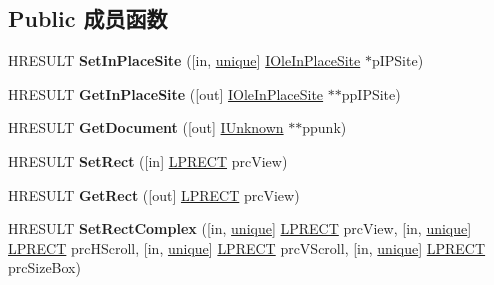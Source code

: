 \subsection*{Public 成员函数}
\begin{DoxyCompactItemize}
\item 
\mbox{\label{interface_i_ole_document_view_aad5d30750419f7ad5e5dbcf5954bf5b9}} 
H\+R\+E\+S\+U\+LT {\bfseries Set\+In\+Place\+Site} (\mbox{[}in, \hyperlink{interfaceunique}{unique}\mbox{]} \hyperlink{interface_i_ole_in_place_site}{I\+Ole\+In\+Place\+Site} $\ast$p\+I\+P\+Site)
\item 
\mbox{\label{interface_i_ole_document_view_a3d394c18927a0facfa48ddbb2cc671ba}} 
H\+R\+E\+S\+U\+LT {\bfseries Get\+In\+Place\+Site} (\mbox{[}out\mbox{]} \hyperlink{interface_i_ole_in_place_site}{I\+Ole\+In\+Place\+Site} $\ast$$\ast$pp\+I\+P\+Site)
\item 
\mbox{\label{interface_i_ole_document_view_aa91053c945356ad752ed4184f8032a21}} 
H\+R\+E\+S\+U\+LT {\bfseries Get\+Document} (\mbox{[}out\mbox{]} \hyperlink{interface_i_unknown}{I\+Unknown} $\ast$$\ast$ppunk)
\item 
\mbox{\label{interface_i_ole_document_view_a7c344fd81af281cbaacaeeb0dd918f5a}} 
H\+R\+E\+S\+U\+LT {\bfseries Set\+Rect} (\mbox{[}in\mbox{]} \hyperlink{structtag_r_e_c_t}{L\+P\+R\+E\+CT} prc\+View)
\item 
\mbox{\label{interface_i_ole_document_view_a25b5227cb06a6147a13a6a3167d51573}} 
H\+R\+E\+S\+U\+LT {\bfseries Get\+Rect} (\mbox{[}out\mbox{]} \hyperlink{structtag_r_e_c_t}{L\+P\+R\+E\+CT} prc\+View)
\item 
\mbox{\label{interface_i_ole_document_view_a163dcdb4f6c67460a2870b2ceb325817}} 
H\+R\+E\+S\+U\+LT {\bfseries Set\+Rect\+Complex} (\mbox{[}in, \hyperlink{interfaceunique}{unique}\mbox{]} \hyperlink{structtag_r_e_c_t}{L\+P\+R\+E\+CT} prc\+View, \mbox{[}in, \hyperlink{interfaceunique}{unique}\mbox{]} \hyperlink{structtag_r_e_c_t}{L\+P\+R\+E\+CT} prc\+H\+Scroll, \mbox{[}in, \hyperlink{interfaceunique}{unique}\mbox{]} \hyperlink{structtag_r_e_c_t}{L\+P\+R\+E\+CT} prc\+V\+Scroll, \mbox{[}in, \hyperlink{interfaceunique}{unique}\mbox{]} \hyperlink{structtag_r_e_c_t}{L\+P\+R\+E\+CT} prc\+Size\+Box)

\end{DoxyCompactItemize}
